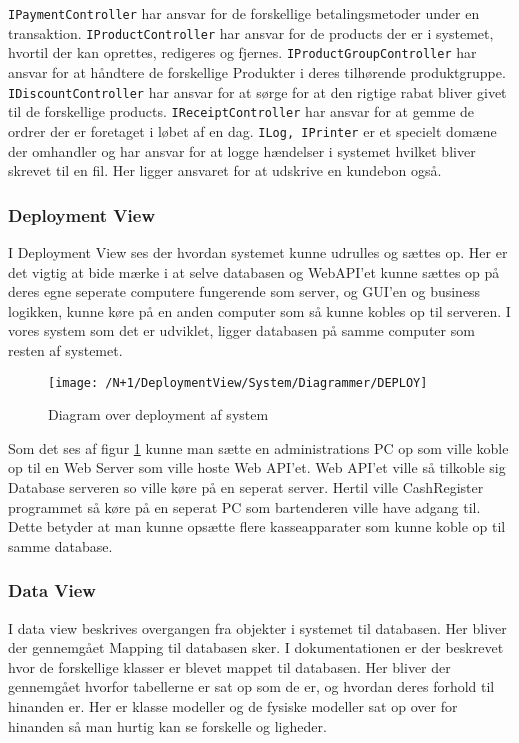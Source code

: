 \texttt{IPaymentController} har ansvar for de forskellige betalingsmetoder under en transaktion. \texttt{IProductController} har ansvar for de products der er i systemet, hvortil der kan oprettes, redigeres og fjernes. 
\texttt{IProductGroupController} har ansvar for at håndtere de forskellige Produkter i deres tilhørende produktgruppe.
\texttt{IDiscountController} har ansvar for at sørge for at den rigtige rabat bliver givet til de forskellige products.
\texttt{IReceiptController} har ansvar for at gemme de ordrer der er foretaget i løbet af en dag.
\texttt{ILog, IPrinter} er et specielt domæne der omhandler og har ansvar for at logge hændelser i systemet hvilket bliver skrevet til en fil. Her ligger ansvaret for at udskrive en kundebon også.


\subsubsection{Deployment View}
I Deployment View ses der hvordan systemet kunne udrulles og sættes op. Her er det vigtig at bide mærke i at selve databasen og \gls{WebAPI}'et kunne sættes op på deres egne seperate computere fungerende som server, og GUI'en og business logikken, kunne køre på en anden computer som så kunne kobles op til serveren. I vores system som det er udviklet, ligger databasen på samme computer som resten af systemet. \newline\newline
\begin{figure}[H]
	\centering
	\texttt{[image: /N+1/DeploymentView/System/Diagrammer/DEPLOY]}
	\caption{Diagram over deployment af system}
	\label{fig:DeplayDia}
\end{figure}
Som det ses af figur \ref{fig:DeplayDia} kunne man sætte en administrations PC op som ville koble op til en Web Server som ville hoste Web API'et. Web API'et ville så tilkoble sig Database serveren so  ville køre på en seperat server. Hertil ville CashRegister programmet så køre på en seperat PC som bartenderen ville have adgang til. Dette betyder at man kunne opsætte flere kasseapparater som kunne koble op til samme database.  

\subsubsection{Data View}
I data view beskrives overgangen fra objekter i systemet til databasen. Her bliver der gennemgået Mapping til databasen sker.\newline\newline
I dokumentationen er der beskrevet hvor de forskellige klasser er blevet mappet til databasen. Her bliver der gennemgået hvorfor tabellerne er sat op som de er, og hvordan deres forhold til hinanden er. Her er klasse modeller og de fysiske modeller sat op over for hinanden så man hurtig kan se forskelle og ligheder.

